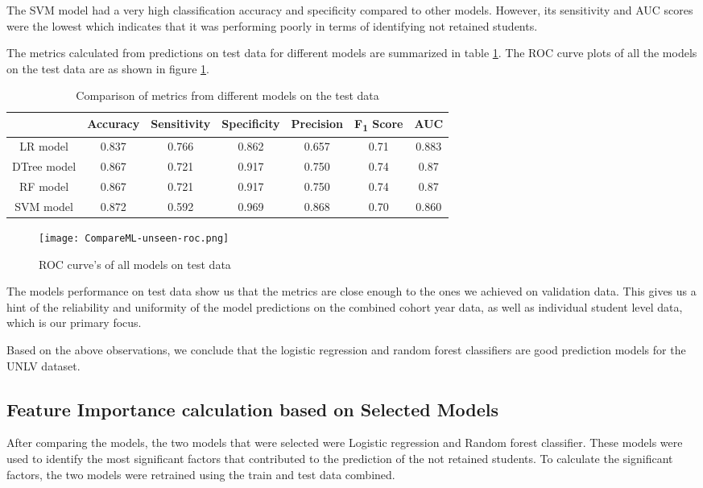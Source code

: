 \documentclass[11pt,openright]{report}
\begin{document}
The SVM model had a very high classification accuracy and specificity compared to other models. However, its sensitivity and AUC scores were the lowest which indicates that it was performing poorly in terms of identifying not retained students. 

The metrics calculated from predictions on test data for different models are summarized in table \ref{table:compare_models_unseen_db}. The ROC curve plots of all the models on the test data are as shown in figure \ref{fig:comparison_test_roc}.


\begin{table}[!htb]
	\renewcommand{\arraystretch}{1.3}
	\caption{Comparison of metrics from different models on the test data}
	\label{table:compare_models_unseen_db}
	\centering
	\begin{tabular}{|c|c|c|c|c|c|c|}
    \hline
  	 & \bfseries Accuracy & \bfseries Sensitivity & \bfseries Specificity & \bfseries Precision & \bfseries F\textsubscript{1} Score  & \bfseries AUC\\  
    \hline
        LR model & 0.837 & 0.766 & 0.862 & 0.657 & 0.71 & 0.883 \\ \hline
        DTree model & 0.867 & 0.721 & 0.917 & 0.750 & 0.74 & 0.87 \\ \hline
        RF model & 0.867 & 0.721 & 0.917 & 0.750 & 0.74 & 0.87 \\ \hline
        SVM model & 0.872 & 0.592 & 0.969 & 0.868 & 0.70 & 0.860 \\ \hline
	\end{tabular} 
\end{table}


 \begin{figure}[!htb]
	\centering
	\texttt{[image: CompareML-unseen-roc.png]}
	\caption{ROC curve's of all models on test data}
	\label{fig:comparison_test_roc}
\end{figure} 

The models performance on test data show us that the metrics are close enough to the ones we achieved on validation data. This gives us a hint of the reliability and uniformity of the model predictions on the combined cohort year data, as well as individual student level data, which is our primary focus.

Based on the above observations, we conclude that the logistic regression and random forest classifiers are good prediction models for the UNLV dataset.



\subsection{Feature Importance calculation based on Selected Models} 
After comparing the models, the two models that were selected were Logistic regression and Random forest classifier. These models were used to identify the most significant factors that contributed to the prediction of the not retained students. To calculate the significant factors, the two models were retrained using the train and test data combined.
\end{document}
